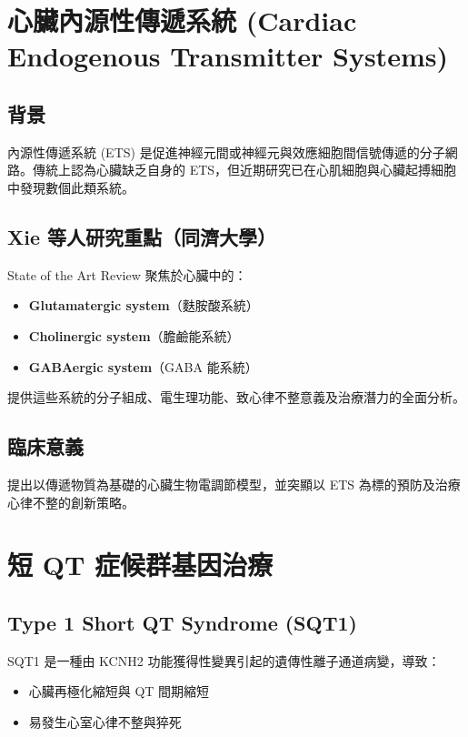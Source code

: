 \documentclass[12pt,a4paper]{article}
\begin{document}
\section{心臟內源性傳遞系統 (Cardiac Endogenous Transmitter Systems)}

\subsection{背景}

內源性傳遞系統 (ETS) 是促進神經元間或神經元與效應細胞間信號傳遞的分子網路。傳統上認為心臟缺乏自身的 ETS，但近期研究已在心肌細胞與心臟起搏細胞中發現數個此類系統。

\subsection{Xie 等人研究重點（同濟大學）}

State of the Art Review 聚焦於心臟中的：
\begin{itemize}
    \item \textbf{Glutamatergic system}（麩胺酸系統）
    \item \textbf{Cholinergic system}（膽鹼能系統）
    \item \textbf{GABAergic system}（GABA 能系統）
\end{itemize}

提供這些系統的分子組成、電生理功能、致心律不整意義及治療潛力的全面分析。

\subsection{臨床意義}

提出以傳遞物質為基礎的心臟生物電調節模型，並突顯以 ETS 為標的預防及治療心律不整的創新策略。

\section{短 QT 症候群基因治療}

\subsection{Type 1 Short QT Syndrome (SQT1)}

SQT1 是一種由 KCNH2 功能獲得性變異引起的遺傳性離子通道病變，導致：
\begin{itemize}
    \item 心臟再極化縮短與 QT 間期縮短
    \item 易發生心室心律不整與猝死
\end{itemize}
\end{document}
